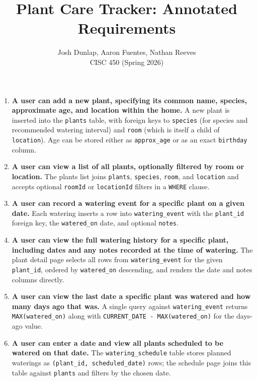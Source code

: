\documentclass[11pt]{article}
\title{Plant Care Tracker: Annotated Requirements}
\author{Josh Dunlap, Aaron Fuentes, Nathan Reeves \\ CISC 450 (Spring 2026)}
\date{}
\begin{document}
\maketitle

\begin{enumerate}

\item \textbf{A user can add a new plant, specifying its common name, species, approximate age, and location within the home.}
A new plant is inserted into the \texttt{plants} table, with foreign keys to \texttt{species} (for species and recommended watering interval) and \texttt{room} (which is itself a child of \texttt{location}). Age can be stored either as \texttt{approx\_age} or as an exact \texttt{birthday} column.

\item \textbf{A user can view a list of all plants, optionally filtered by room or location.}
The plants list joins \texttt{plants}, \texttt{species}, \texttt{room}, and \texttt{location} and accepts optional \texttt{roomId} or \texttt{locationId} filters in a \texttt{WHERE} clause.

\item \textbf{A user can record a watering event for a specific plant on a given date.}
Each watering inserts a row into \texttt{watering\_event} with the \texttt{plant\_id} foreign key, the \texttt{watered\_on} date, and optional \texttt{notes}.

\item \textbf{A user can view the full watering history for a specific plant, including dates and any notes recorded at the time of watering.}
The plant detail page selects all rows from \texttt{watering\_event} for the given \texttt{plant\_id}, ordered by \texttt{watered\_on} descending, and renders the date and notes columns directly.

\item \textbf{A user can view the last date a specific plant was watered and how many days ago that was.}
A single query against \texttt{watering\_event} returns \texttt{MAX(watered\_on)} along with \texttt{CURRENT\_DATE - MAX(watered\_on)} for the days-ago value.

\item \textbf{A user can enter a date and view all plants scheduled to be watered on that date.}
The \texttt{watering\_schedule} table stores planned waterings as \texttt{(plant\_id, scheduled\_date)} rows; the schedule page joins this table against \texttt{plants} and filters by the chosen date.


\end{enumerate}
\end{document}
